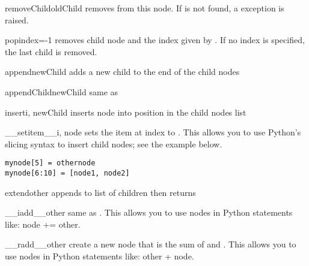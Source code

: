\documentclass{manual}
\begin{document}
\begin{methoddesc}[Node]{removeChild}{oldChild}
removes  from this node.  If  is not found,
a  exception is raised.
\end{methoddesc}

\begin{methoddesc}[Node]{pop}{index=-1}
removes child node and the index given by .  If no index is
specified, the last child is removed.
\end{methoddesc}

\begin{methoddesc}[Node]{append}{newChild}
adds a new child to the end of the child nodes
\end{methoddesc}

\begin{methoddesc}[Node]{appendChild}{newChild}
same as 
\end{methoddesc}

\begin{methoddesc}[Node]{insert}{i, newChild}
inserts node  into position  in the child nodes list
\end{methoddesc}

\begin{methoddesc}[Node]{\_\_setitem\_\_}{i, node}
sets the item at index  to .  This allows you to use 
Python's slicing syntax to insert child nodes; see the example below.
\begin{verbatim}
mynode[5] = othernode
mynode[6:10] = [node1, node2]
\end{verbatim}
\end{methoddesc}

\begin{methoddesc}[Node]{extend}{other}
appends  to list of children then returns 
\end{methoddesc}

\begin{methoddesc}[Node]{\_\_iadd\_\_}{other}
same as .  This allows you to use nodes in Python statements
like: node += other.
\end{methoddesc}

\begin{methoddesc}[Node]{\_\_radd\_\_}{other}
create a new node that is the sum of  and .  This
allows you to use nodes in Python statements like: other + node.
\end{methoddesc}
\end{document}
